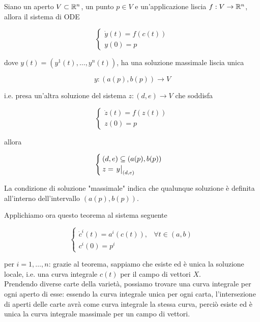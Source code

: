 \begin{theorem}
	Siano un aperto $ V \subset \mathbb{R}^{n} $, un punto $ p \in V $ e un'applicazione liscia $ f : V \to \mathbb{R}^{n} $, allora il sistema di ODE
	
	\begin{equation}
		\begin{cases}
			\dot{y}(t) = f(c(t)) \\
			y(0) = p
		\end{cases}
	\end{equation}
	
	dove $ y(t) = (y^{1}(t),\dots,y^{n}(t)) $, ha una soluzione massimale liscia unica
	
	\begin{equation}
		y : (a(p),b(p)) \to V
	\end{equation}

	i.e. presa un'altra soluzione del sistema $ z : (d,e) \to V $ che soddisfa
	
	\begin{equation}
		\begin{cases}
			\dot{z}(t) = f(z(t)) \\
			z(0) = p
		\end{cases}
	\end{equation}

	allora
	
	\begin{equation}
		\begin{cases}
			(d,e) \subseteq (a(p),b(p)) \\
			z = \eval{y}_{(d,e)}
		\end{cases}
	\end{equation}

	 La condizione di soluzione "massimale" indica che qualunque soluzione è definita all'interno dell'intervallo $ (a(p),b(p)) $.
\end{theorem}

Applichiamo ora questo teorema al sistema seguente

\begin{equation}
	\begin{cases}
		\dot{c}^{i}(t) = a^{i}(c(t)), & \forall t \in (a,b) \\
		c^{i}(0) = p^{i}
	\end{cases}
\end{equation}

per $ i=1,\dots,n $: grazie al teorema, sappiamo che esiste ed è unica la soluzione locale, i.e. una curva integrale $ c(t) $ per il campo di vettori $ X $. \\
Prendendo diverse carte della varietà, possiamo trovare una curva integrale per ogni aperto di esse: essendo la curva integrale unica per ogni carta, l'intersezione di aperti delle carte avrà come curva integrale la stessa curva, perciò esiste ed è unica la curva integrale massimale per un campo di vettori.

